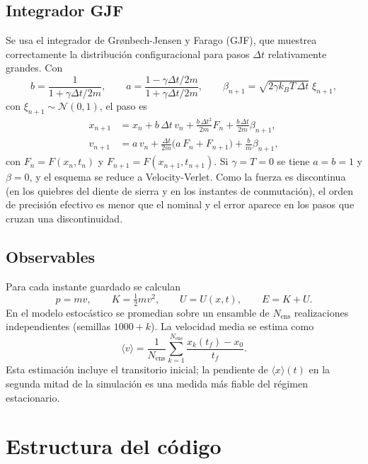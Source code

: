 \documentclass[11pt,a4paper]{article}
\begin{document}
\subsection{Integrador GJF}
Se usa el integrador de Grønbech-Jensen y Farago (GJF), que muestrea correctamente la distribución configuracional para pasos $\Delta t$ relativamente grandes. Con
\begin{equation}
b=\frac{1}{1+\gamma\Delta t/2m},\qquad
a=\frac{1-\gamma\Delta t/2m}{1+\gamma\Delta t/2m},\qquad
\beta_{n+1}=\sqrt{2\gamma k_BT\,\Delta t}\;\xi_{n+1},
\end{equation}
con $\xi_{n+1}\sim\mathcal N(0,1)$, el paso es
\begin{align}
x_{n+1}&=x_n+b\,\Delta t\,v_n+\frac{b\,\Delta t^2}{2m}F_n+\frac{b\,\Delta t}{2m}\beta_{n+1},\\
v_{n+1}&=a\,v_n+\frac{\Delta t}{2m}\big(a\,F_n+F_{n+1}\big)+\frac{b}{m}\beta_{n+1},
\end{align}
con $F_n=F(x_n,t_n)$ y $F_{n+1}=F(x_{n+1},t_{n+1})$. Si $\gamma=T=0$ se tiene $a=b=1$ y $\beta=0$, y el esquema se reduce a Velocity-Verlet. Como la fuerza es discontinua (en los quiebres del diente de sierra y en los instantes de conmutación), el orden de precisión efectivo es menor que el nominal y el error aparece en los pasos que cruzan una discontinuidad.

\subsection{Observables}
Para cada instante guardado se calculan
\begin{equation}
p=mv,\qquad K=\tfrac12 mv^2,\qquad U=U(x,t),\qquad E=K+U .
\end{equation}
En el modelo estocástico se promedian sobre un ensamble de $N_{\text{ens}}$ realizaciones independientes (semillas $1000+k$). La velocidad media se estima como
\begin{equation}
\langle v\rangle=\frac{1}{N_{\text{ens}}}\sum_{k=1}^{N_{\text{ens}}}\frac{x_k(t_f)-x_0}{t_f}.
\end{equation}
Esta estimación incluye el transitorio inicial; la pendiente de $\langle x\rangle(t)$ en la segunda mitad de la simulación es una medida más fiable del régimen estacionario.

\section{Estructura del código}
\end{document}
